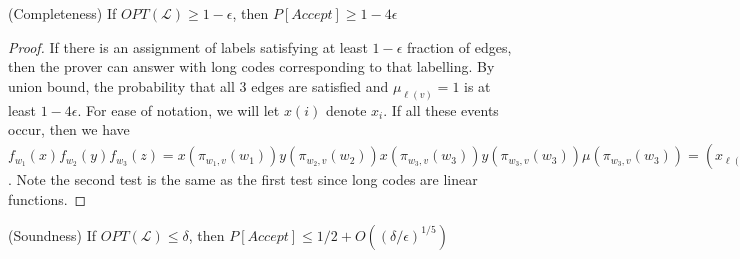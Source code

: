 \documentclass{article}
\newcommand{\1}{\mathbbm{1}}
\begin{document}
\begin{lemma}
(Completeness) If $OPT(\mathcal{L}) \geq 1-\epsilon$, then $P[Accept] \geq 1-4\epsilon$
\end{lemma}
\begin{proof}
If there is an assignment of labels satisfying at least $1-\epsilon$ fraction of edges, then the prover can answer with long codes corresponding to that labelling. By union bound, the probability that all 3 edges are satisfied and $\mu_{\ell(v)} = 1$ is at least $1-4\epsilon$. For ease of notation, we will let $x(i)$ denote $x_i$. If all these events occur, then we have $f_{w_1}(x)f_{w_2}(y)f_{w_3}(z) = x(\pi_{w_1,v}(w_1))y(\pi_{w_2,v}(w_2))x(\pi_{w_3,v}(w_3))y(\pi_{w_3,v}(w_3))\mu(\pi_{w_3,v}(w_3)) = (x_{\ell(v)}y_{\ell(v)})^2\mu_{\ell(v)} = 1$. Note the second test is the same as the first test since long codes are linear functions.
\end{proof}
\begin{lemma}
(Soundness) If $OPT(\mathcal{L})\leq \delta$, then $P[Accept]\leq 1/2 + O((\delta/\epsilon)^{1/5})$
\end{lemma}
\end{document}
